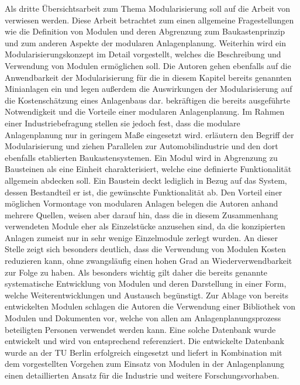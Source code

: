 Als dritte \"Ubersichtsarbeit zum Thema Modularisierung soll auf die Arbeit  von \citeauthor{Hady_2012} \cite{Hady_2012} verwiesen werden. Diese Arbeit betrachtet zum einen allgemeine Fragestellungen wie die Definition von Modulen und deren Abgrenzung zum Baukastenprinzip und zum anderen Aspekte der modularen Anlagenplanung. Weiterhin wird ein Modularisierungskonzept im Detail vorgestellt, welches die Beschreibung und Verwendung von Modulen erm\"oglichen soll. Die Autoren gehen ebenfalls auf die Anwendbarkeit der Modularisierung f\"ur die in diesem Kapitel bereits genannten Minianlagen ein und legen au\ss{}erdem die Auswirkungen der Modularisierung auf die Kostensch\"atzung eines Anlagenbaus dar.\newline
\citeauthor{Hady_2012} bekr\"aftigen die bereits ausgef\"uhrte Notwendigkeit und die Vorteile einer modularen Anlagenplanung. Im Rahmen einer Industriebefragung stellen sie jedoch fest, dass die modulare Anlagenplanung nur in geringem Ma\ss{}e eingesetzt wird. \citeauthor{Hady_2012} erl\"autern den Begriff der Modularisierung und ziehen Parallelen zur Automobilindustrie und den dort ebenfalls etablierten Baukastensystemen. Ein Modul wird in Abgrenzung zu Bausteinen als eine Einheit charakterisiert, welche eine definierte Funktionalit\"at allgemein abdecken soll. Ein Baustein deckt lediglich in Bezug auf das System, dessen Bestandteil er ist, die gew\"unschte Funktionalit\"at ab. \newline
Den Vorteil einer m\"oglichen Vormontage von modularen Anlagen belegen die Autoren anhand mehrere Quellen, weisen aber darauf hin, dass die in diesem Zusammenhang verwendeten Module  eher als Einzelst\"ucke anzusehen sind, da die konzipierten Anlagen zumeist nur in sehr wenige Einzelmodule zerlegt wurden. An dieser Stelle zeigt sich besonders deutlich, dass die Verwendung von Modulen Kosten reduzieren kann, ohne zwangsl\"aufig einen hohen Grad an Wiederverwendbarkeit zur Folge zu haben. Als besonders wichtig gilt daher die bereits genannte systematische Entwicklung von Modulen und deren Darstellung in einer Form, welche Weiterentwicklungen und Austausch beg\"unstigt. \newline
Zur Ablage von bereits entwickelten Modulen schlagen die Autoren die Verwendung einer Bibliothek von Modulen und Dokumenten vor, welche von allen am Anlagenplanungsprozess beteiligten Personen verwendet werden kann. Eine solche Datenbank wurde entwickelt und wird von \citeauthor{Hady_2012} entsprechend referenziert. Die entwickelte Datenbank wurde an der TU Berlin erfolgreich eingesetzt und liefert in Kombination mit dem vorgestellten Vorgehen zum Einsatz von Modulen in der Anlagenplanung einen detaillierten Ansatz f\"ur die Industrie und weitere Forschungsvorhaben. \cite{Hady_2012}

